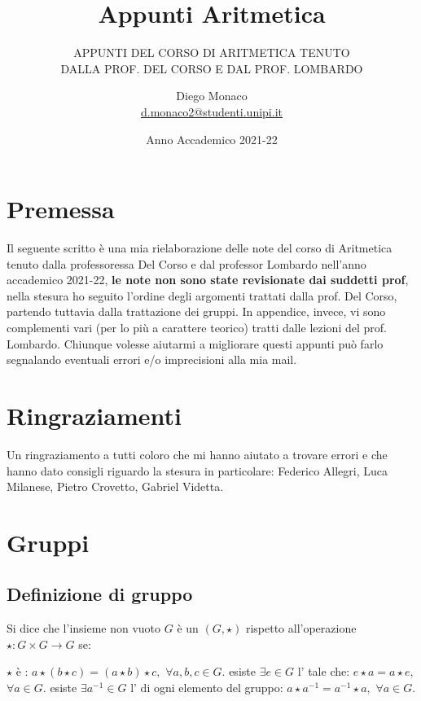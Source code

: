 \documentclass[11pt]{scrartcl}
\begin{document}
\title{Appunti Aritmetica}
\subtitle{\large\normalfont\rmfamily\scshape APPUNTI DEL CORSO DI ARITMETICA TENUTO\\ DALLA PROF. DEL CORSO E DAL PROF. LOMBARDO}
\author{Diego Monaco \\ \textnormal{\href{d.monaco2@studenti.unipi.it}{d.monaco2@studenti.unipi.it}}}
\date{Anno Accademico 2021-22}
\maketitle
\newpage

\section*{Premessa}
Il seguente scritto è una mia rielaborazione delle note del corso di Aritmetica tenuto dalla professoressa Del Corso e dal professor Lombardo nell'anno accademico 
2021-22, \textbf{le note non sono state revisionate dai suddetti prof}, nella stesura ho seguito l'ordine degli argomenti trattati dalla prof. Del Corso, partendo tuttavia
dalla trattazione dei gruppi. In appendice, invece, vi sono complementi vari (per lo più a carattere teorico) tratti dalle lezioni del prof. Lombardo. Chiunque volesse aiutarmi a migliorare questi appunti 
può farlo segnalando eventuali errori e/o imprecisioni alla mia mail.

\section*{Ringraziamenti}
Un ringraziamento a tutti coloro che mi hanno aiutato a trovare errori e che hanno dato consigli riguardo la stesura in particolare: Federico Allegri, 
Luca Milanese, Pietro Crovetto, Gabriel Videtta.
\newpage

\tableofcontents
\eject


\newpage
\section{Gruppi}
\subsection{Definizione di gruppo}
\begin{definition}
	Si dice che l'insieme non vuoto $G$ è un  $(G,\star)$ rispetto all'operazione $\star: G \times G \rightarrow G$ se:
	\begin{itemize}
		\ii $\star$ è : $a \star (b \star c)=(a \star b) \star c,$ $\forall a,b,c \in G$.
		\ii esiste $\exists e \in G$ l' tale che: $e \star a = a \star e,$ $\forall a \in G$.
		\ii esiste $\exists a^{-1} \in G$ l' di ogni elemento del gruppo: $a \star a^{-1} = a^{-1} \star a,$ $\forall a \in G$.
	\end{itemize}
\end{definition}
\end{document}
